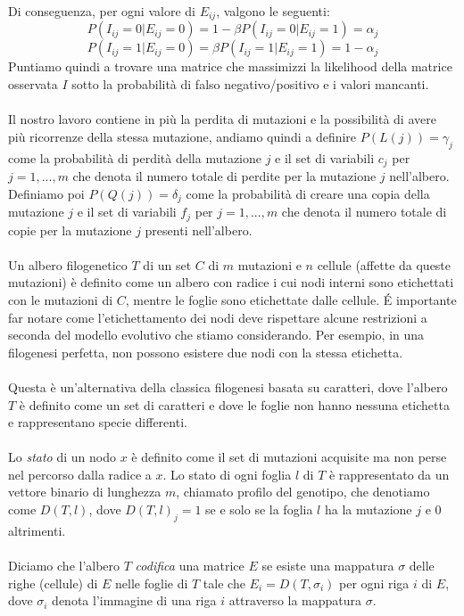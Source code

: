 \documentclass[12pt]{report}
\begin{document}
  Di conseguenza, per ogni valore di ${E}_{ij}$, valgono le seguenti:
  \[
    P(I_{ij} = 0|{E}_{ij} = 0) = 1 - \beta P(I_{ij} = 0|E_{ij} = 1) = \alpha_{j}
  \]
  \[
    P(I_{ij} = 1|E_{ij} = 0) = \beta P(I_{ij} = 1|E_{ij} = 1) = 1 - \alpha_{j}
  \]
  Puntiamo quindi a trovare una matrice che massimizzi la likelihood della matrice osservata $I$ sotto la probabilità di falso negativo/positivo e i valori mancanti.\\\\
  Il nostro lavoro contiene in più la perdita di mutazioni e la possibilità di avere più ricorrenze della stessa mutazione, andiamo quindi a definire $P(L(j))={\gamma}_{j}$ come la probabilità di perdità della mutazione $j$ e il set di variabili ${c}_{j}$ per $j=1,...,m$ che denota il numero totale di perdite per la mutazione $j$ nell'albero.
  Definiamo poi $P(Q(j))={\delta}_{j}$ come la probabilità di creare una copia della mutazione $j$ e il set di variabili ${f}_{j}$ per $j=1,...,m$ che denota il numero totale di copie per la mutazione $j$ presenti nell'albero.\\\\
  Un albero filogenetico $T$ di un set $C$ di $m$ mutazioni e $n$ cellule (affette da queste mutazioni) è definito come un albero con radice i cui nodi interni sono etichettati con le mutazioni di $C$, mentre le foglie sono etichettate dalle cellule.
  \'E importante far notare come l'etichettamento dei nodi deve rispettare alcune restrizioni a seconda del modello evolutivo che stiamo considerando. Per esempio, in una filogenesi perfetta, non possono esistere due nodi con la stessa etichetta.\\\\
  Questa è un'alternativa della classica filogenesi basata su caratteri, dove l'albero $T$ è definito come un set di caratteri e dove le foglie non hanno nessuna etichetta e rappresentano specie differenti.\\\\
  Lo \emph{stato} di un nodo $x$ è definito come il set di mutazioni acquisite ma non perse nel percorso dalla radice a $x$. Lo stato di ogni foglia $l$ di $T$ è rappresentato da un vettore binario di lunghezza $m$, chiamato profilo del genotipo, che denotiamo come $D(T, l)$, dove $D{(T, l)}_{j}=1$ se e solo se la foglia $l$ ha la mutazione $j$ e 0 altrimenti.\\\\
  Diciamo che l'albero $T$ \emph{codifica} una matrice $E$ se esiste una mappatura $\sigma$ delle righe (cellule) di $E$ nelle foglie di $T$ tale che $E_{i}=D(T, \sigma_{i})$ per ogni riga $i$ di $E$, dove ${\sigma}_{i}$ denota l'immagine di una riga $i$ attraverso la mappatura $\sigma$.
\end{document}
